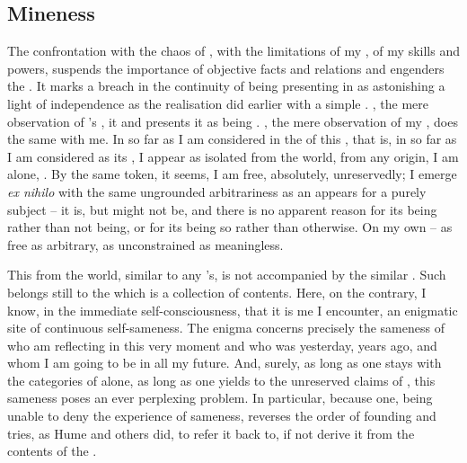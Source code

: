 
\subsection{Mineness}\label{sec:levelC}
\pa\label{refl:C}
The confrontation with the chaos of , with the limitations of my
, of my skills and powers, suspends the importance of objective facts
and relations and engenders the .  It marks a breach in the continuity of being presenting 
in as astonishing a light of  independence as the realisation
 did earlier with a simple .  , the
mere observation  of 's ,
 it and presents it as being .  , the mere observation  of my , does the
same with me.  In so far as I am considered in the  of this
, that is, in so far as I am considered as its , I appear as
isolated from the world, from any origin, I am alone, . By the
same token, it seems, I am free, absolutely, unreservedly; I emerge {\em ex
  nihilo} with the same ungrounded arbitrariness as an  appears for a
purely  subject -- it is, but might not be, and there is no apparent
reason for its being rather than not being, or for its being so rather than
otherwise. On my own  -- as free
as arbitrary, as unconstrained as meaningless. 

This  from the world, similar to any 's, is
not accompanied by the similar .  Such  belongs
still to the  which is a collection of  contents. Here,
on the contrary, I know, in the immediate self-consciousness, that it is me
 I encounter, an enigmatic site of continuous self-sameness.  The
enigma concerns precisely the sameness of  who am reflecting in this
very moment and  who was yesterday, years ago, and whom I am going to
be in all my future. And, surely, as long as one stays with the categories of
 alone, as long as one yields to the unreserved claims of
, this sameness poses an ever perplexing problem. In
particular, because one, being unable to deny the experience of sameness,
reverses the order of founding and tries, as Hume and others did, to refer it
back to, if not derive it from the  contents of the .

